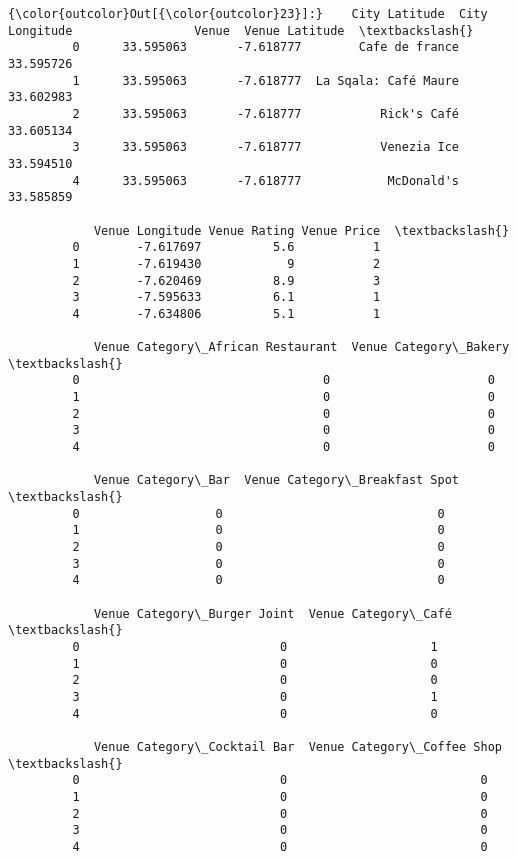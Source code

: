\documentclass[11pt]{article}
\begin{document}
\begin{Verbatim}[commandchars=\\\{\}]
{\color{outcolor}Out[{\color{outcolor}23}]:}    City Latitude  City Longitude                 Venue  Venue Latitude  \textbackslash{}
         0      33.595063       -7.618777        Cafe de france       33.595726   
         1      33.595063       -7.618777  La Sqala: Café Maure       33.602983   
         2      33.595063       -7.618777           Rick's Café       33.605134   
         3      33.595063       -7.618777           Venezia Ice       33.594510   
         4      33.595063       -7.618777            McDonald's       33.585859   
         
            Venue Longitude Venue Rating Venue Price  \textbackslash{}
         0        -7.617697          5.6           1   
         1        -7.619430            9           2   
         2        -7.620469          8.9           3   
         3        -7.595633          6.1           1   
         4        -7.634806          5.1           1   
         
            Venue Category\_African Restaurant  Venue Category\_Bakery  \textbackslash{}
         0                                  0                      0   
         1                                  0                      0   
         2                                  0                      0   
         3                                  0                      0   
         4                                  0                      0   
         
            Venue Category\_Bar  Venue Category\_Breakfast Spot  \textbackslash{}
         0                   0                              0   
         1                   0                              0   
         2                   0                              0   
         3                   0                              0   
         4                   0                              0   
         
            Venue Category\_Burger Joint  Venue Category\_Café  \textbackslash{}
         0                            0                    1   
         1                            0                    0   
         2                            0                    0   
         3                            0                    1   
         4                            0                    0   
         
            Venue Category\_Cocktail Bar  Venue Category\_Coffee Shop  \textbackslash{}
         0                            0                           0   
         1                            0                           0   
         2                            0                           0   
         3                            0                           0   
         4                            0                           0   
         

\end{Verbatim}
\end{document}
